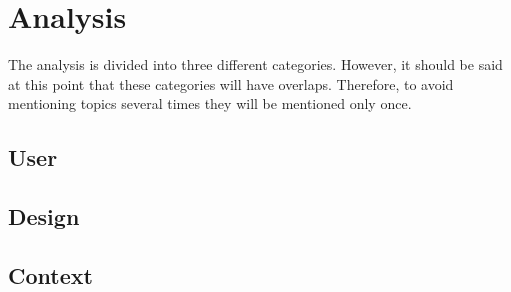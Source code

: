 \section{Analysis}\label{sec:analysis}
The analysis is divided into three different categories.
However, it should be said at this point that these categories will have overlaps.
Therefore, to avoid mentioning topics several times they will be mentioned only once.

\subsection{User}




\subsection{Design}


\subsection{Context}
